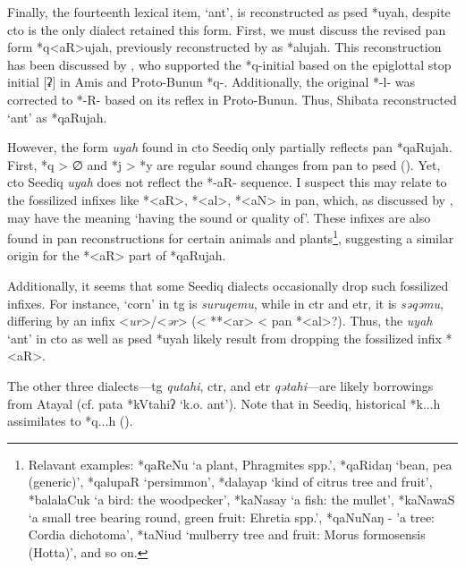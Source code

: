 
Finally, the fourteenth lexical item, `ant', is reconstructed as \acl{psed} *uyah, despite \acl{cto} is the only dialect retained this form. First, we must discuss the revised \acs{pan} form *q<aR>ujah, previously reconstructed by \textcite{acd} as *alujah. This reconstruction has been discussed by \textcite[146--47]{shibata2020pbun}, who supported the *q-initial based on the epiglottal stop initial [ʡ] in Amis and Proto-Bunun *q-. Additionally, the original *-l- was corrected to *-R- based on its reflex in Proto-Bunun. Thus, Shibata reconstructed `ant' as *qaRujah.

However, the form \textit{uyah} found in \acl{cto} Seediq only partially reflects \acs{pan} *qaRujah. First, *q > ∅ and *j > *y are regular sound changes from \acs{pan} to \acl{psed} (\cite{song2023Aicgprime,song2024sedq}). Yet, \acl{cto} Seediq \textit{uyah} does not reflect the *-aR- sequence. I suspect this may relate to the fossilized infixes like *<aR>, *<al>, *<aN> in \acl{pan}, which, as discussed by \textcite{li_tsuchida2009_AnInfixes}, may have the meaning `having the sound or quality of'. These infixes are also found in \acl{pan} reconstructions for certain animals and plants\footnote{Relavant examples: *qaReNu `a plant, Phragmites spp.', *qaRidaŋ `bean, pea (generic)', *qalupaR `persimmon', *dalayap `kind of citrus tree and fruit', *balalaCuk `a bird: the woodpecker', *kaNasay `a fish: the mullet', *kaNawaS `a small tree bearing round, green fruit: Ehretia spp.', *qaNuNaŋ - 'a tree: Cordia dichotoma', *taNiud `mulberry tree and fruit: Morus formosensis (Hotta)', and so on.}, suggesting a similar origin for the *<aR> part of *qaRujah. 

Additionally, it seems that some Seediq dialects occasionally drop such fossilized infixes. For instance, `corn' in \acl{tg} is \textit{suruqemu}, while in \acl{ctr} and \acl{etr}, it is \textit{səqəmu}, differing by an infix <\textit{ur}>/<\textit{ər}> (< **<ar> < \acs{pan} *<al>?). Thus, the \textit{uyah} `ant' in \acl{cto} as well as \acl{psed} *uyah likely result from dropping the fossilized infix *<aR>.

The other three dialects—\acl{tg} \textit{qutahi}, \acl{ctr}, and \acl{etr} \textit{qətahi}—are likely borrowings from Atayal (cf. \acl{pata} *kVtahiʔ `k.o. ant'). Note that in Seediq, historical *k...h assimilates to *q...h (\cite[247-48]{li1981paic}).

